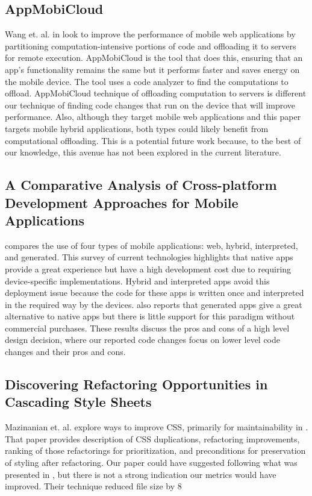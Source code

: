 \documentclass{acm_proc_article-sp}
\begin{document}
\subsection{AppMobiCloud \cite{Wang:2013:AIM:2532443.2532445}}
Wang et. al. in \cite{Wang:2013:AIM:2532443.2532445} look to improve the performance of mobile web applications by partitioning computation-intensive portions of code and offloading it to servers for remote execution. 
AppMobiCloud is the tool that does this, ensuring that an app's functionality remains the same but it performs faster and saves energy on the mobile device.
The tool uses a code analyzer to find the computations to offload. 
AppMobiCloud technique of offloading computation to servers is different our technique of finding code changes that run on the device that will improve performance.
Also, although they target mobile web applications and this paper targets mobile hybrid applications, both types could likely benefit from computational offloading.
This is a potential future work because, to the best of our knowledge, this avenue has not been explored in the current literature.

\subsection{A Comparative Analysis of Cross-platform Development Approaches for Mobile Applications \cite{Xanthopoulos:2013:CAC:2490257.2490292}}
\cite{Xanthopoulos:2013:CAC:2490257.2490292} compares the use of four types of mobile applications: web, hybrid, interpreted, and generated. 
This survey of current technologies highlights that native apps provide a great experience but have a high development cost due to requiring device-specific implementations.
Hybrid and interpreted apps avoid this deployment issue because the code for these apps is written once and interpreted in the required way by the devices. 
\cite{Xanthopoulos:2013:CAC:2490257.2490292} also reports that generated apps give a great alternative to native apps but there is little support for this paradigm without commercial purchases. 
These results discuss the pros and cons of a high level design decision, where our reported code changes focus on lower level code changes and their pros and cons.

\subsection{Discovering Refactoring Opportunities in Cascading Style Sheets \cite{Mazinanian:2014:DRO:2635868.2635879}}
Mazinanian et. al. explore ways to improve CSS, primarily for maintainability in \cite{Mazinanian:2014:DRO:2635868.2635879}. 
That paper provides description of CSS duplications, refactoring improvements, ranking of those refactorings for prioritization, and preconditions for preservation of styling after refactoring.
Our paper could have suggested following what was presented in \cite{Mazinanian:2014:DRO:2635868.2635879}, but there is not a strong indication our metrics would have improved.
Their technique reduced file size by 8%
\end{document}

